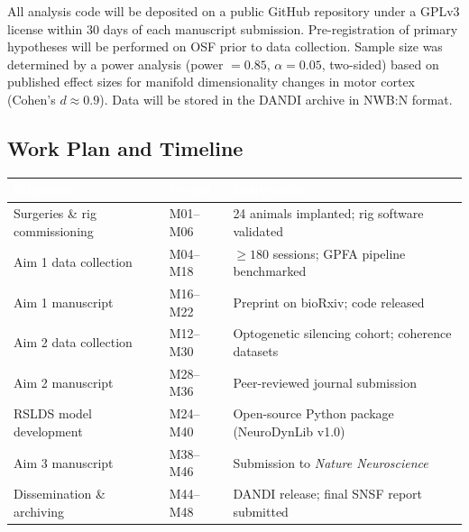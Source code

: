 All analysis code will be deposited on a public GitHub repository under a GPLv3 license within
30 days of each manuscript submission. Pre-registration of primary hypotheses will be performed
on OSF prior to data collection. Sample size was determined by a power analysis (power
$=0.85$, $\alpha=0.05$, two-sided) based on published effect sizes for manifold dimensionality
changes in motor cortex (Cohen's $d \approx 0.9$). Data will be stored in the DANDI archive
in NWB:N format.

\vspace{6pt}

\subsection{Work Plan and Timeline}

\begin{tcolorbox}[snsfbox, title={\faCalendar\quad Project Timeline (48 months)}]
\begin{center}
\renewcommand{\arraystretch}{1.35}
\begin{tabularx}{\linewidth}{@{}p{3.4cm} p{2.2cm} X@{}}
  \toprule
  \rowcolor{SNSFnavy}
  \textcolor{white}{\bfseries Milestone} &
  \textcolor{white}{\bfseries Period} &
  \textcolor{white}{\bfseries Deliverable} \\
  \midrule
  Surgeries \& rig commissioning & M01--M06 & 24 animals implanted; rig software validated\\
  \rowcolor{rowalt}
  Aim 1 data collection & M04--M18 & $\geq 180$ sessions; GPFA pipeline benchmarked\\
  Aim 1 manuscript & M16--M22 & Preprint on bioRxiv; code released\\
  \rowcolor{rowalt}
  Aim 2 data collection & M12--M30 & Optogenetic silencing cohort; coherence datasets\\
  Aim 2 manuscript & M28--M36 & Peer-reviewed journal submission\\
  \rowcolor{rowalt}
  RSLDS model development & M24--M40 & Open-source Python package (NeuroDynLib v1.0)\\
  Aim 3 manuscript & M38--M46 & Submission to \textit{Nature Neuroscience}\\
  \rowcolor{rowalt}
  Dissemination \& archiving & M44--M48 & DANDI release; final SNSF report submitted\\
  \bottomrule
\end{tabularx}
\end{center}
\end{tcolorbox}

\vspace{6pt}

